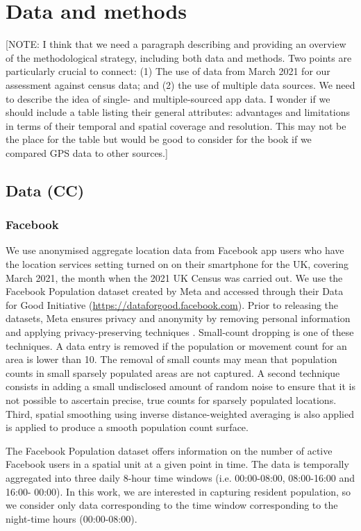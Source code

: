 \documentclass[]{rsos}%
\begin{document}
\section{Data and methods}\label{data-and-methods}

{[}NOTE: I think that we need a paragraph describing and providing an
overview of the methodological strategy, including both data and
methods. Two points are particularly crucial to connect: (1) The use of
data from March 2021 for our assessment against census data; and (2) the
use of multiple data sources. We need to describe the idea of single-
and multiple-sourced app data. I wonder if we should include a table
listing their general attributes: advantages and limitations in terms of
their temporal and spatial coverage and resolution. This may not be the
place for the table but would be good to consider for the book if we
compared GPS data to other sources.{]}

\subsection{Data (CC)}\label{data-cc}

\subsubsection{Facebook}\label{facebook}

We use anonymised aggregate location data from Facebook app users who
have the location services setting turned on on their smartphone for the
UK, covering March 2021, the month when the 2021 UK Census was carried
out. We use the Facebook Population dataset created by Meta and accessed
through their Data for Good Initiative
(\url{https://dataforgood.facebook.com}). Prior to releasing the datasets,
Meta ensures privacy and anonymity by removing personal information and
applying privacy-preserving techniques \citep{maas2019} . Small-count
dropping is one of these techniques. A data entry is removed if the
population or movement count for an area is lower than 10. The removal
of small counts may mean that population counts in small sparsely
populated areas are not captured. A second technique consists in adding
a small undisclosed amount of random noise to ensure that it is not
possible to ascertain precise, true counts for sparsely populated
locations. Third, spatial smoothing using inverse distance-weighted
averaging is also applied is applied to produce a smooth population
count surface.

The Facebook Population dataset offers information on the number of
active Facebook users in a spatial unit at a given point in time. The
data is temporally aggregated into three daily 8-hour time windows (i.e.
00:00-08:00, 08:00-16:00 and 16:00- 00:00). In this work, we are
interested in capturing resident population, so we consider only data
corresponding to the time window corresponding to the night-time hours
(00:00-08:00).
\end{document}
